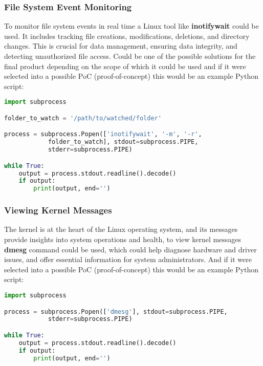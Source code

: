 \documentclass{VUMIFPSmagistrinis}
\begin{document}
\subsubsection{File System Event Monitoring}
To monitor file system events in real time a Linux tool like \textbf{inotifywait} could be used. It includes tracking file creations, modifications, deletions, and directory changes. This is crucial for data management, ensuring data integrity, and detecting unauthorized file access. Could be one of the possible solutions for the final product depending on the scope of which it could be used and if it were selected into a possible PoC (proof-of-concept) this would be an example Python script:
\begin{lstlisting}[language=Python]
import subprocess

folder_to_watch = '/path/to/watched/folder'

process = subprocess.Popen(['inotifywait', '-m', '-r', 
            folder_to_watch], stdout=subprocess.PIPE, 
            stderr=subprocess.PIPE)

while True:
    output = process.stdout.readline().decode()
    if output:
        print(output, end='')
\end{lstlisting}

\subsubsection{Viewing Kernel Messages}
The kernel is at the heart of the Linux operating system, and its messages provide insights into system operations and health, to view kernel messages \textbf{dmesg} command could be used, which could help diagnose hardware and driver issues, and offer essential information for system administrators. And if it were selected into a possible PoC (proof-of-concept) this would be an example Python script:
\begin{lstlisting}[language=Python]
import subprocess

process = subprocess.Popen(['dmesg'], stdout=subprocess.PIPE, 
            stderr=subprocess.PIPE)

while True:
    output = process.stdout.readline().decode()
    if output:
        print(output, end='')
\end{lstlisting}
\end{document}
